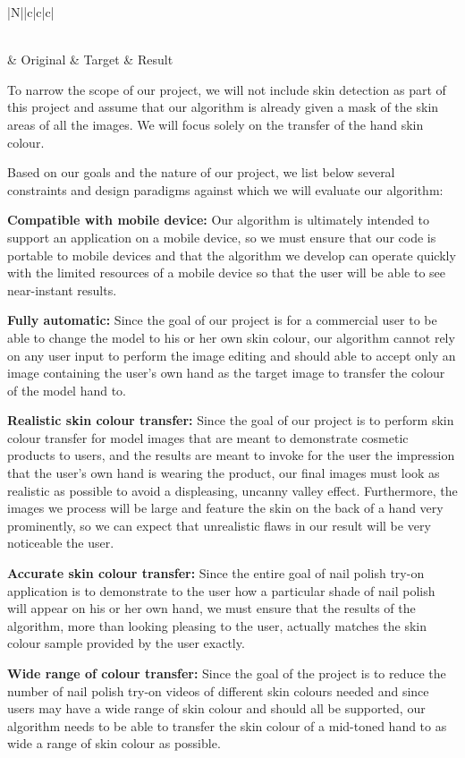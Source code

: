 \begin{longtable}{|N||c|c|c|}
	\caption{Example of our desired result given an original (the model) and a target image (from the user) \label{tab:our_demo}}\\
	\hline
	 & Original & Target & Result \\ 
	\hline
		
 \end{longtable}

To narrow the scope of our project, we will not include skin detection as part of this project and assume that our algorithm is already given a mask of the skin areas of all the images. We will focus solely on the transfer of the hand skin colour. 

Based on our goals and the nature of our project, we list below several constraints and design paradigms against which we will evaluate our algorithm:

\textbf{Compatible with mobile device:} Our algorithm is ultimately intended to support an application on a mobile device, so we must ensure that our code is portable to mobile devices and that the algorithm we develop can operate quickly with the limited resources of a mobile device so that the user will be able to see near-instant results.

\textbf{Fully automatic:} Since the goal of our project is for a commercial user to be able to change the model to his or her own skin colour, our algorithm cannot rely on any user input to perform the image editing and should able to accept only an image containing the user's own hand as the target image to transfer the colour of the model hand to.

\textbf{Realistic skin colour transfer:}
Since the goal of our project is to perform skin colour transfer for model images that are meant to demonstrate cosmetic products to users, and the results are meant to invoke for the user the impression that the user's own hand is wearing the product, our final images must look as realistic as possible to avoid a displeasing, uncanny valley effect. Furthermore, the images we process will be large and feature the skin on the back of a hand very prominently, so we can expect that unrealistic flaws in our result will be very noticeable the user.

\textbf{Accurate skin colour transfer:} 
Since the entire goal of nail polish try-on application is to demonstrate to the user how a particular shade of nail polish will appear on his or her own hand, we must ensure that the results of the algorithm, more than looking pleasing to the user, actually matches the skin colour sample provided by the user exactly.

\textbf{Wide range of colour transfer:} Since the goal of the project is to reduce the number of nail polish try-on videos of different skin colours needed and since users may have a wide range of skin colour and should all be supported, our algorithm needs to be able to transfer the skin colour of a mid-toned hand to as wide a range of skin colour as possible.